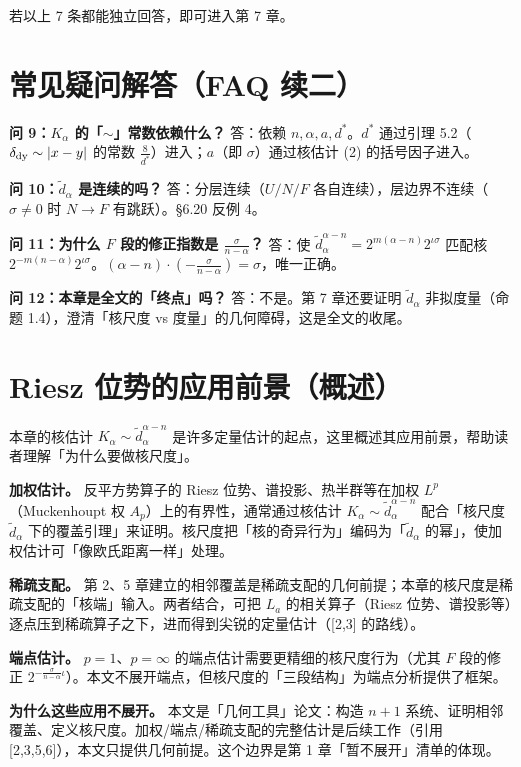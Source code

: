 \documentclass[a4paper,11pt,openany]{ctexbook}
\numberwithin{equation}{chapter}
\numberwithin{figure}{chapter}
\numberwithin{table}{chapter}
\begin{document}
若以上 7 条都能独立回答，即可进入第 7 章。

\section{常见疑问解答（FAQ 续二）}

\textbf{问 9：$K_\alpha$ 的「$\sim$」常数依赖什么？} 答：依赖 $n,\alpha,a,d^*$。$d^*$ 通过引理 5.2（$\delta_{\rm dy}\sim|x-y|$ 的常数 $\frac8{d^*}$）进入；$a$（即 $\sigma$）通过核估计 (2) 的括号因子进入。

\textbf{问 10：$\widetilde d_\alpha$ 是连续的吗？} 答：分层连续（$U/N/F$ 各自连续），层边界不连续（$\sigma\neq0$ 时 $N\to F$ 有跳跃）。§6.20 反例 4。

\textbf{问 11：为什么 $F$ 段的修正指数是 $\frac{\sigma}{n-\alpha}$？} 答：使 $\widetilde d_\alpha^{\alpha-n}=2^{m(\alpha-n)}2^{\iota\sigma}$ 匹配核 $2^{-m(n-\alpha)}2^{\iota\sigma}$。$(\alpha-n)\cdot(-\frac{\sigma}{n-\alpha})=\sigma$，唯一正确。

\textbf{问 12：本章是全文的「终点」吗？} 答：不是。第 7 章还要证明 $\widetilde d_\alpha$ 非拟度量（命题 1.4），澄清「核尺度 vs 度量」的几何障碍，这是全文的收尾。

\section{Riesz 位势的应用前景（概述）}

本章的核估计 $K_\alpha\sim\widetilde d_\alpha^{\alpha-n}$ 是许多定量估计的起点，这里概述其应用前景，帮助读者理解「为什么要做核尺度」。

\textbf{加权估计。} 反平方势算子的 Riesz 位势、谱投影、热半群等在加权 $L^p$（Muckenhoupt 权 $A_p$）上的有界性，通常通过核估计 $K_\alpha\sim\widetilde d_\alpha^{\alpha-n}$ 配合「核尺度 $\widetilde d_\alpha$ 下的覆盖引理」来证明。核尺度把「核的奇异行为」编码为「$\widetilde d_\alpha$ 的幂」，使加权估计可「像欧氏距离一样」处理。

\textbf{稀疏支配。} 第 2、5 章建立的相邻覆盖是稀疏支配的几何前提；本章的核尺度是稀疏支配的「核端」输入。两者结合，可把 $L_a$ 的相关算子（Riesz 位势、谱投影等）逐点压到稀疏算子之下，进而得到尖锐的定量估计（[2,3] 的路线）。

\textbf{端点估计。} $p=1$、$p=\infty$ 的端点估计需要更精细的核尺度行为（尤其 $F$ 段的修正 $2^{-\frac{\sigma}{n-\alpha}\iota}$）。本文不展开端点，但核尺度的「三段结构」为端点分析提供了框架。

\textbf{为什么这些应用不展开。} 本文是「几何工具」论文：构造 $n+1$ 系统、证明相邻覆盖、定义核尺度。加权/端点/稀疏支配的完整估计是后续工作（引用 [2,3,5,6]），本文只提供几何前提。这个边界是第 1 章「暂不展开」清单的体现。
\end{document}
